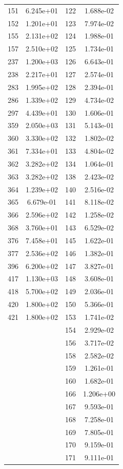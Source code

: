 \documentclass[12pt]{article}
\begin{document}
\begin{longtable}{@{}cccc@{}}
151 & 6.245e+01 & 122 & 1.688e-02 \\
152 & 1.201e+01 & 123 & 7.974e-02 \\
155 & 2.131e+02 & 124 & 1.988e-01 \\
157 & 2.510e+02 & 125 & 1.734e-01 \\
237 & 1.200e+03 & 126 & 6.643e-01 \\
238 & 2.217e+01 & 127 & 2.574e-01 \\
283 & 1.995e+02 & 128 & 2.394e-01 \\
286 & 1.339e+02 & 129 & 4.734e-02 \\
297 & 4.439e+01 & 130 & 1.606e-01 \\
359 & 2.050e+03 & 131 & 5.143e-01 \\
360 & 3.330e+02 & 132 & 1.802e-02 \\
361 & 7.334e+01 & 133 & 4.804e-02 \\
362 & 3.282e+02 & 134 & 1.064e-01 \\
363 & 3.282e+02 & 138 & 2.423e-02 \\
364 & 1.239e+02 & 140 & 2.516e-02 \\
365 & 6.679e-01 & 141 & 8.118e-02 \\
366 & 2.596e+02 & 142 & 1.258e-02 \\
368 & 3.760e+01 & 143 & 6.529e-02 \\
376 & 7.458e+01 & 145 & 1.622e-01 \\
377 & 2.536e+02 & 146 & 1.382e-01 \\
396 & 6.200e+02 & 147 & 3.827e-01 \\
417 & 1.130e+03 & 148 & 3.608e-01 \\
418 & 5.700e+02 & 149 & 2.036e-01 \\
420 & 1.800e+02 & 150 & 5.366e-01 \\
421 & 1.800e+02 & 153 & 1.741e-02 \\
 &  & 154 & 2.929e-02 \\
 &  & 156 & 3.717e-02 \\
 &  & 158 & 2.582e-02 \\
 &  & 159 & 1.261e-01 \\
 &  & 160 & 1.682e-01 \\
 &  & 166 & 1.206e+00 \\
 &  & 167 & 9.593e-01 \\
 &  & 168 & 7.258e-01 \\
 &  & 169 & 7.805e-01 \\
 &  & 170 & 9.159e-01 \\
 &  & 171 & 9.111e-01 \\

\end{longtable}
\end{document}
